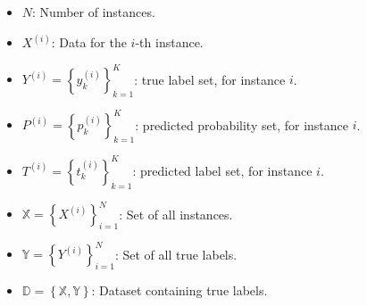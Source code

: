 \documentclass[preprint,3p,times, review]{elsarticle}
\begin{document}
\begin{itemize}
    \item  $N $: Number of instances.

    \item $X^{(i)} $: Data for the $i $-th instance.

    \item $Y^{(i)} = \left\{y_k^{(i)}\right\}_{k=1}^{K} $: true label set, for instance $i $.

    \item  $P^{(i)} = \left\{p_k^{(i)}\right\}_{k=1}^{K} $: predicted probability set, for instance $i $.

    \item  $T^{(i)} = \left\{t_k^{(i)}\right\}_{k=1}^{K} $: predicted label set, for instance $i $.

    \item  $\mathbb{X}=\left\{X^{(i)}\right\}_{i=1}^{N} $: Set of all instances.

    \item  $\mathbb{Y} = \left\{Y^{(i)}\right\}_{i=1}^{N} $: Set of all true labels.

    \item  $\mathbb{D} = \left\{\mathbb{X},\mathbb{Y} \right\} $: Dataset containing true labels.





\end{itemize}
\end{document}
